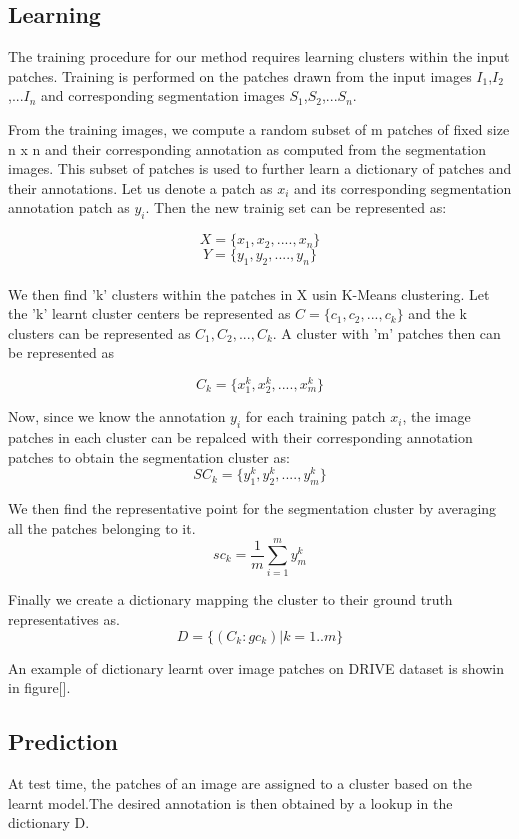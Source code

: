 \subsection{Learning}

The training procedure for our method requires learning clusters within the input patches. Training is performed on the patches drawn from the input images $I_1$,$I_2$,...$I_n$ and corresponding segmentation images $S_1$,$S_2$,...$S_n$. 

From the training images, we compute a random subset of m patches of fixed size n x n and their corresponding annotation as computed from the segmentation images. This subset of patches is used to further learn a dictionary of patches and their annotations. Let us denote a patch as $x_i$ and its corresponding segmentation annotation patch as $y_i$. Then the new trainig set can be represented as:

$$
X = \{x_1,x_2,....,x_n\}
$$
$$
Y = \{y_1,y_2,....,y_n\}
$$
\\
We then find 'k' clusters within the patches in X usin K-Means clustering. Let the 'k' learnt cluster centers be represented as $C = \{c_1, c_2,..., c_k\} $ and the k clusters can be represented as $C_1,C_2,...,C_k$. A cluster with 'm' patches then can be represented as

$$
C_k = \{x^k_1,x^k_2,....,x^k_m\}
$$

Now, since we know the annotation $y_i$ for each training patch $x_i$, the image patches in each cluster can be repalced with their corresponding annotation patches to obtain the segmentation cluster as:
$$
SC_k = \{y^k_1,y^k_2,....,y^k_m\}
$$

We then find the representative point for the segmentation cluster by averaging all the patches belonging to it.
$$	
sc_k = \frac{1}{m}\sum\limits_{i=1}^{m} y^k_m
$$

Finally we create a dictionary mapping the cluster to their ground truth representatives as.
$$
D = \{ (C_k : gc_k) | k =1..m\}
$$

An example of dictionary learnt over image patches on DRIVE dataset is showin in figure[].

\subsection{Prediction}
At test time, the patches of an image are assigned to a cluster based on the learnt model.The desired annotation is then obtained by a lookup in the dictionary D.

